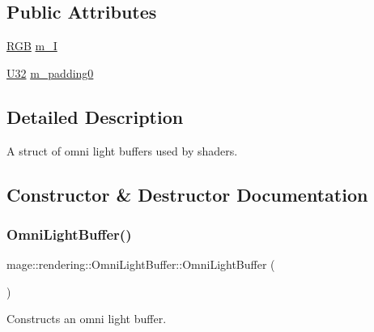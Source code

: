 \subsection*{Public Attributes}
\begin{DoxyCompactItemize}
\item 
\mbox{\hyperlink{structmage_1_1_r_g_b}{R\+GB}} \mbox{\hyperlink{structmage_1_1rendering_1_1_omni_light_buffer_a01b8cc152dd0ea2b961448ad3057a5d0}{m\+\_\+I}}
\item 
\mbox{\hyperlink{namespacemage_a41c104c036fba3756a74e19f793eeaa1}{U32}} \mbox{\hyperlink{structmage_1_1rendering_1_1_omni_light_buffer_a3b440492e1a9fc48c6f109e5787aa4c7}{m\+\_\+padding0}}
\end{DoxyCompactItemize}


\subsection{Detailed Description}
A struct of omni light buffers used by shaders. 

\subsection{Constructor \& Destructor Documentation}
\mbox{\label{structmage_1_1rendering_1_1_omni_light_buffer_a7429503e161d324c66ecad2250bc69a2}} 
\subsubsection{\texorpdfstring{Omni\+Light\+Buffer()}{OmniLightBuffer()}\hspace{0.1cm}{\footnotesize\ttfamily [1/3]}}
{\footnotesize\ttfamily mage\+::rendering\+::\+Omni\+Light\+Buffer\+::\+Omni\+Light\+Buffer (\begin{DoxyParamCaption}{ }\end{DoxyParamCaption})\hspace{0.3cm}{\ttfamily [noexcept]}}

Constructs an omni light buffer. \mbox{\label{structmage_1_1rendering_1_1_omni_light_buffer_a716417506a93d27a0093b408e88f92e4}} 
